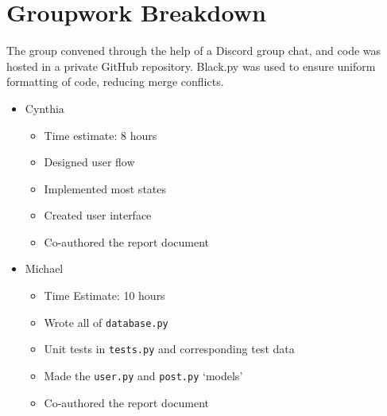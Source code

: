 \documentclass{article}
\begin{document}




\section{Groupwork Breakdown}

The group convened through the help of a Discord group chat, and code was hosted in a private GitHub repository. Black.py was used to ensure uniform formatting of code, reducing merge conflicts.

\begin{itemize}
    \item Cynthia
          \begin{itemize}
              \item Time estimate: 8 hours
              \item Designed user flow
              \item Implemented most states
              \item Created user interface
              \item Co-authored the report document
          \end{itemize}
    \item Michael
          \begin{itemize}
              \item Time Estimate: 10 hours
              \item Wrote all of \verb|database.py|
              \item Unit tests in \verb|tests.py| and corresponding test data
              \item Made the \verb|user.py| and \verb|post.py| `models'
              \item Co-authored the report document
          \end{itemize}
\end{itemize}
\end{document}
